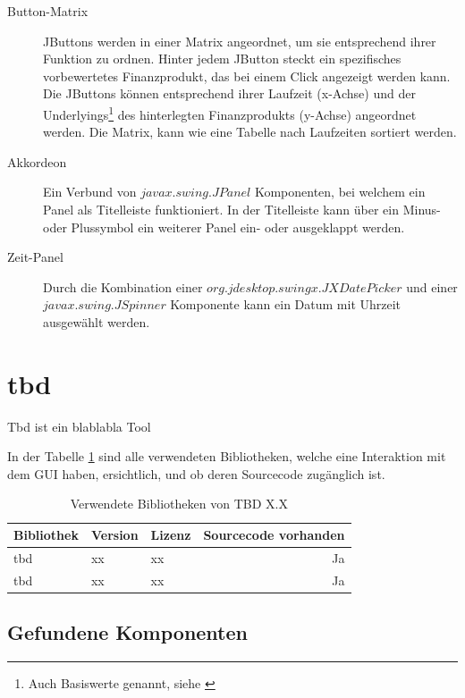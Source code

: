   \begin{description}
    \item[Button-Matrix]
    JButtons werden in einer Matrix angeordnet, um sie entsprechend ihrer
    Funktion zu ordnen. Hinter jedem JButton steckt ein spezifisches
    vorbewertetes Finanzprodukt, das bei einem Click angezeigt werden kann.
    Die JButtons können entsprechend ihrer Laufzeit (x-Achse) und der
    Underlyings\footnote{Auch Basiswerte genannt, siehe \cite{Basiswerte}} des
    hinterlegten Finanzprodukts (y-Achse) angeordnet werden. Die Matrix, kann
    wie eine Tabelle nach Laufzeiten sortiert werden.
    \item[Akkordeon]
    Ein Verbund von \(javax.swing.JPanel\) Komponenten, bei welchem ein
    Panel als Titelleiste funktioniert. In der Titelleiste kann über ein Minus-
    oder Plussymbol ein weiterer Panel ein- oder ausgeklappt werden.
    \item[Zeit-Panel]
    Durch die Kombination einer \(org.jdesktop.swingx.JXDatePicker\) und einer
    \(javax.swing.JSpinner\) Komponente kann ein Datum mit Uhrzeit ausgewählt
    werden.
  \end{description}
  
  \section{tbd}
  
  Tbd ist ein blablabla Tool
  
  In der Tabelle \ref{tab:bibliothekenTbd} sind alle verwendeten
  Bibliotheken, welche eine Interaktion mit dem \ac{GUI} haben, ersichtlich,
  und ob deren Sourcecode zugänglich ist.
  
  \begin{table}[ht]
    \begin{center}
      \begin{tabular}{lllr}
        \toprule
        Bibliothek & Version & Lizenz & Sourcecode vorhanden \\
        \midrule
        tbd & xx & xx & Ja\\
        tbd & xx & xx & Ja\\
        \bottomrule
      \end{tabular}
      \caption{Verwendete Bibliotheken von TBD X.X}
      \label{tab:bibliothekenTbd}
    \end{center}
  \end{table}
  
  \subsection{Gefundene Komponenten}
  
